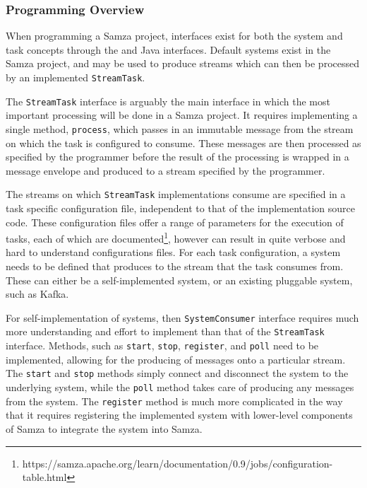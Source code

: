 \subsubsection{Programming Overview}

When programming a Samza project, interfaces exist for both the system and task concepts through the 
and  Java interfaces. Default systems exist in the Samza project, and may be
used to produce streams which can then be processed by an implemented \texttt{StreamTask}.

The \texttt{StreamTask} interface is arguably the main interface in which the most important processing will be done in
a Samza project. It requires implementing a single method, \texttt{process}, which passes in an immutable message from the stream
on which the task is configured to consume. These messages are then processed as specified by the programmer before the
result of the processing is wrapped in a message envelope and produced to a stream specified by the programmer.

The streams on which \texttt{StreamTask} implementations consume are specified in a task specific configuration file,
independent to that of the implementation source code. These configuration files offer a range of parameters for the
execution of tasks, each of which are documented\footnote{https://samza.apache.org/learn/documentation/0.9/jobs/configuration-table.html},
however can result in quite verbose and hard to understand configurations files. For each task configuration, a system
needs to be defined that produces to the stream that the task consumes from. These can either be a self-implemented
system, or an existing pluggable system, such as Kafka.

For self-implementation of systems, then \texttt{SystemConsumer} interface requires much more understanding and effort to
implement than that of the \texttt{StreamTask} interface. Methods, such as \texttt{start}, \texttt{stop}, \texttt{register},
and \texttt{poll} need to be implemented, allowing for the producing of messages onto a particular stream. The \texttt{start}
and \texttt{stop} methods simply connect and disconnect the system to the underlying system, while the \texttt{poll}
method takes care of producing any messages from the system. The \texttt{register} method is much more complicated in the
way that it requires registering the implemented system with lower-level components of Samza to integrate the system into
Samza.

